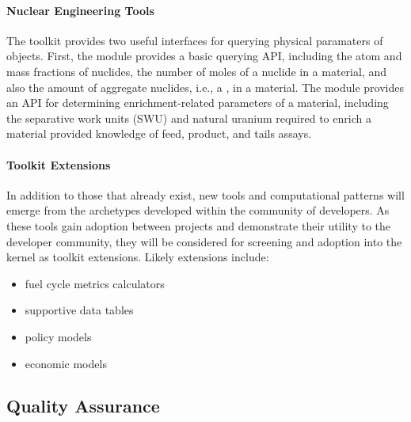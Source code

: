 \paragraph{Nuclear Engineering Tools}

The \Cyclus toolkit provides two useful interfaces for querying physical paramaters of 
objects. First, the  module
provides a basic querying \gls{API}, including the atom and mass fractions of
nuclides, the number of moles of a nuclide in a material, and also the amount of
aggregate nuclides, i.e., a , in a material. The
 module provides an \gls{API} for determining enrichment-related
parameters of a material, including the separative work units (SWU) and natural
uranium required to enrich a material provided knowledge of feed, product, and tails
assays.

\paragraph{Toolkit Extensions}

In addition to those that already exist, new tools and computational patterns will
emerge from the archetypes developed within the community of
developers. As these tools gain adoption between projects and demonstrate their
utility to the developer community, they will be considered for screening and
adoption into the kernel as toolkit extensions. Likely extensions include:

\begin{itemize}
\item fuel cycle metrics calculators
\item supportive data tables
\item policy models
\item economic models
\end{itemize}

\subsection{Quality Assurance}
%

%

